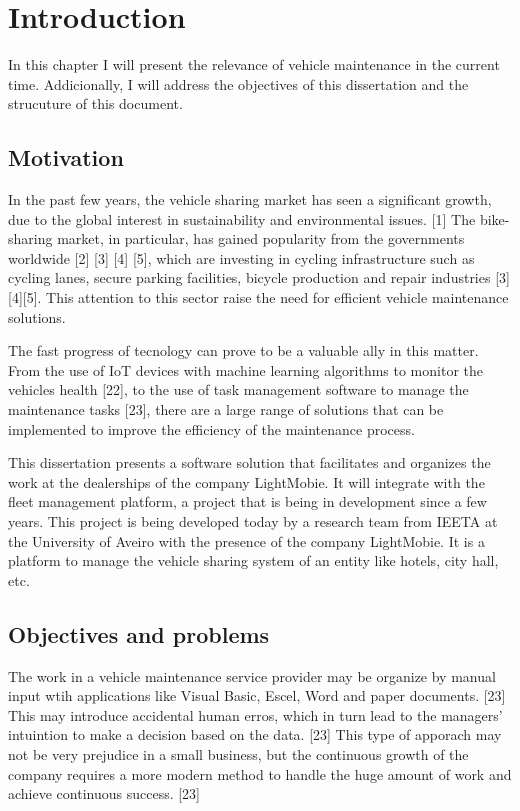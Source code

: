 \chapter{Introduction}%
\label{chapter:introduction}

\begin{introduction}
In this chapter I will present the relevance of vehicle maintenance in the current time. Addicionally, I will address the objectives of this dissertation and the strucuture of this document.
\end{introduction} 


\section{Motivation}

In the past few years, the vehicle sharing market has seen a significant growth, due to the global interest in sustainability and environmental issues. [1]
The bike-sharing market, in particular, has gained popularity from the governments worldwide [2] [3] [4] [5], which are investing in cycling infrastructure such as cycling lanes, secure parking facilities, bicycle production and repair industries [3][4][5].
This attention to this sector raise the need for efficient vehicle maintenance solutions.

The fast progress of tecnology can prove to be a valuable ally in this matter. 
From the use of IoT devices with machine learning algorithms to monitor the vehicles health [22], 
to the use of task management software to manage the maintenance tasks [23], 
there are a large range of solutions that can be implemented to improve the efficiency of the maintenance process.

This dissertation presents a software solution that facilitates and organizes the work at the dealerships of the company LightMobie. 
It will integrate with the fleet management platform, a project that is being in development since a few years. 
This project is being developed today by a research team from  \ac{IEETA} at the University of Aveiro with the presence of the company LightMobie.
It is a platform to manage the vehicle sharing system of an entity like hotels, city hall, etc.  

\section{Objectives and problems}

The work in a vehicle maintenance service provider may be organize by manual input wtih applications like Visual Basic, Escel, Word and paper documents. [23] 
This may introduce accidental human erros, which in turn lead to the managers' intuintion to make a decision based on the data. [23]
This type of apporach may not be very prejudice in a small business, but the continuous growth of the company requires a more modern method to handle the huge amount of work and achieve continuous success. [23]

